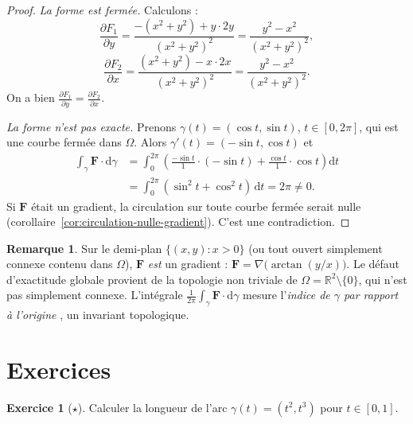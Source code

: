 \documentclass[12pt,a4paper,openany]{book}
\theoremstyle{definition}
\newtheorem{remarque}{Remarque}[chapter]
\newtheorem{exercice}{Exercice}[chapter]
\newcommand{\R}{\mathbb{R}}
\newcommand{\dd}{\mathrm{d}}
\begin{document}
\begin{proof}
  \emph{La forme est fermée.} Calculons :
  \[
    \frac{\partial F_1}{\partial y}
    = \frac{-(x^2+y^2)+y\cdot 2y}{(x^2+y^2)^2}
    = \frac{y^2-x^2}{(x^2+y^2)^2},
  \]
  \[
    \frac{\partial F_2}{\partial x}
    = \frac{(x^2+y^2)-x\cdot 2x}{(x^2+y^2)^2}
    = \frac{y^2-x^2}{(x^2+y^2)^2}.
  \]
  On a bien $\frac{\partial F_1}{\partial y} = \frac{\partial F_2}
  {\partial x}$.

  \emph{La forme n'est pas exacte.} Prenons $\gamma(t) = (\cos t,
  \sin t)$, $t \in [0, 2\pi]$, qui est une courbe fermée dans $\Omega$.
  Alors $\gamma'(t) = (-\sin t, \cos t)$ et
  \begin{align*}
    \int_\gamma\mathbf{F}\cdot\dd\gamma
    &= \int_0^{2\pi}\left(\frac{-\sin t}{1}\cdot(-\sin t)
    + \frac{\cos t}{1}\cdot\cos t\right)\dd t \\
    &= \int_0^{2\pi}(\sin^2 t + \cos^2 t)\,\dd t = 2\pi \neq 0.
  \end{align*}
  Si $\mathbf{F}$ était un gradient, la circulation sur toute courbe
  fermée serait nulle (corollaire~\ref{cor:circulation-nulle-gradient}).
  C'est une contradiction.
\end{proof}

\begin{remarque}\label{rem:argument}
  Sur le demi-plan $\{(x,y) : x > 0\}$ (ou tout ouvert simplement
  connexe contenu dans $\Omega$), $\mathbf{F}$ \emph{est} un gradient :
  $\mathbf{F} = \nabla\bigl(\arctan(y/x)\bigr)$. Le défaut d'exactitude
  globale provient de la topologie non triviale de
  $\Omega = \R^2\setminus\{0\}$, qui n'est pas simplement connexe.
  L'intégrale $\frac{1}{2\pi}\int_\gamma\mathbf{F}\cdot\dd\gamma$
  mesure l'\emph{indice de $\gamma$ par rapport à l'origine}%
  , un invariant topologique.
\end{remarque}



\section{Exercices}
\label{sec:exercices-chap11}

\begin{exercice}[$\star$]
  Calculer la longueur de l'arc $\gamma(t) = (t^2, t^3)$ pour
  $t \in [0,1]$.
\end{exercice}
\end{document}
